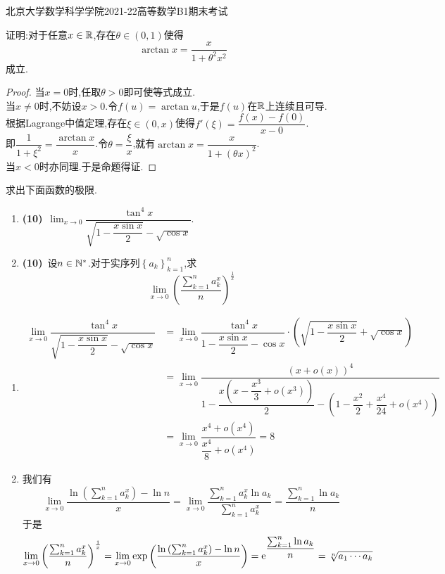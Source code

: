 \documentclass{ctexart}
\begin{document}
\pagestyle{empty}
\begin{center}\Large
    北京大学数学科学学院2021-22高等数学B1期末考试
\end{center}
\begin{problem}[1.(10\songti{分})]
    证明:对于任意$x\in\mathbb{R}$,存在$\theta\in(0,1)$使得
    \[\arctan x=\dfrac{x}{1+\theta^2x^2}\]
    成立.
\end{problem}
\begin{proof}
    当$x=0$时,任取$\theta>0$即可使等式成立.\\
    当$x\neq 0$时,不妨设$x>0$.令$f(u)=\arctan u$,于是$f(u)$在$\mathbb{R}$上连续且可导.\\
    根据Lagrange中值定理,存在$\xi\in(0,x)$使得$f'(\xi)=\dfrac{f(x)-f(0)}{x-0}$.\\
    即$\dfrac{1}{1+\xi^2}=\dfrac{\arctan x}{x}$.令$\theta=\dfrac{\xi}{x}$,就有$\arctan x=\dfrac{x}{1+(\theta x)^2}$.\\
    当$x<0$时亦同理.于是命题得证.
\end{proof}
\begin{problem}[2.(20\songti{分})]
    求出下面函数的极限.
    \begin{enumerate}[label=\textbf{(\arabic*)},leftmargin=*]
        \item \textbf{(10)}\ $\displaystyle\lim_{x\to0}\dfrac{\tan^4x}{\sqrt{1-\dfrac{x\sin x}{2}}-\sqrt{\cos x}}$.
        \item \textbf{(10)}\ 设$n\in\mathbb{N}^*$.对于实序列$\left\{a_k\right\}_{k=1}^n$,求\[\lim_{x\to0}\left(\dfrac{\sum_{k=1}^na_k^x}{n}\right)^{\frac{1}{x}}\]
    \end{enumerate}
\end{problem}
\begin{solution}
    \begin{enumerate}[label=\textbf{(\arabic*)},leftmargin=*]
        \item \[\begin{aligned}
            \lim_{x\to0}\dfrac{\tan^4x}{\sqrt{1-\dfrac{x\sin x}{2}}-\sqrt{\cos x}}
            &= \lim_{x\to0}\dfrac{\tan^4x}{1-\dfrac{x\sin x}{2}-\cos x}\cdot\left(\sqrt{1-\dfrac{x\sin x}{2}}+\sqrt{\cos x}\right) \\
            &= \lim_{x\to0}\dfrac{(x+o(x))^4}{1-\dfrac{x\left(x-\dfrac{x^3}{3}+o(x^3)\right)}{2}-\left(1-\dfrac{x^2}{2}+\dfrac{x^4}{24}+o(x^4)\right)} \\
            &= \lim_{x\to0}\dfrac{x^4+o(x^4)}{\dfrac{x^4}{8}+o(x^4)} = 8
            \end{aligned}\]
        \item 我们有
            \[\lim_{x\to0}\dfrac{\ln\left(\displaystyle\sum_{k=1}^na_k^x\right)-\ln n}{x}=\lim_{x\to0}\dfrac{\displaystyle\sum_{k=1}^{n}a_k^x\ln a_k}{\displaystyle\sum_{k=1}^{n}a_k^x}=\dfrac{\displaystyle\sum_{k=1}^n\ln a_k}{n}\]
            于是
            \[\lim_{x\to0}\left(\dfrac{\sum_{k=1}^na_k^x}{n}\right)^{\frac{1}{x}}=\lim_{x\to0}\text{exp}\left(\dfrac{\ln\left(\sum_{k=1}^na_k^x\right)-\ln n}{x}\right)=\mathrm{e}^{\dfrac{\sum_{k=1}^n\ln a_k}{n}}=\sqrt[n]{a_1\cdots a_k}\]
    \end{enumerate}
\end{solution}
\end{document}
